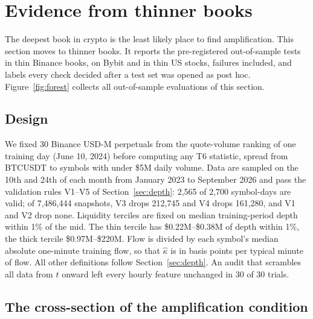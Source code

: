\section{Evidence from thinner books}\label{sec:thin}

The deepest book in crypto is the least likely place to find amplification. This section moves to thinner books. It reports the pre-registered out-of-sample tests in thin Binance books, on Bybit and in thin US stocks, failures included, and labels every check decided after a test set was opened as post hoc. Figure~\ref{fig:forest} collects all out-of-sample evaluations of this section.

\subsection{Design}\label{sec:thin_design}
We fixed 30 Binance USD-M perpetuals from the quote-volume ranking of one training day (June 10, 2024) before computing any T6 statistic, spread from BTCUSDT to symbols with under \$5M daily volume. Data are sampled on the 10th and 24th of each month from January 2023 to September 2026 and pass the validation rules V1--V5 of Section~\ref{sec:depth}: 2{,}565 of 2{,}700 symbol-days are valid; of 7{,}486{,}444 snapshots, V3 drops 212{,}745 and V4 drops 161{,}280, and V1 and V2 drop none. Liquidity terciles are fixed on median training-period depth within 1\% of the mid. The thin tercile has \$0.22M--\$0.38M of depth within 1\%, the thick tercile \$0.97M--\$220M. Flow is divided by each symbol's median absolute one-minute training flow, so that $\hat\kappa$ is in basis points per typical minute of flow. All other definitions follow Section~\ref{sec:depth}. An audit that scrambles all data from $t$ onward left every hourly feature unchanged in 30 of 30 trials.

\subsection{The cross-section of the amplification condition}

